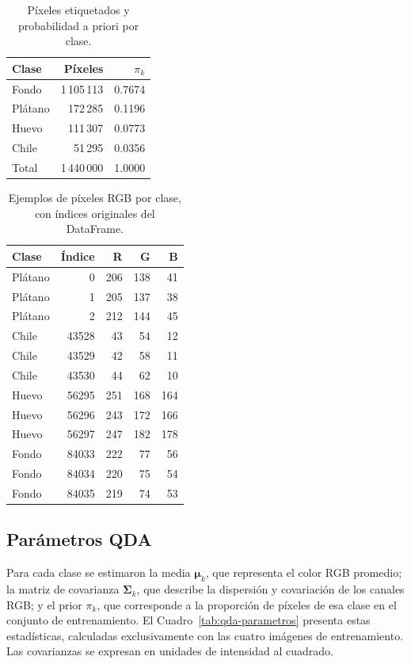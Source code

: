 \documentclass[conference]{IEEEtran}
\begin{document}
\begin{table}[!t]
\centering
\caption{Píxeles etiquetados y probabilidad a priori por clase.}
\label{tab:conteos}
\small
\begin{tabular}{lrr}
\toprule
Clase & Píxeles & $\pi_k$ \\
\midrule
Fondo & 1\,105\,113 & 0.7674 \\
Plátano & 172\,285 & 0.1196 \\
Huevo & 111\,307 & 0.0773 \\
Chile & 51\,295 & 0.0356 \\
\midrule
Total & 1\,440\,000 & 1.0000 \\
\bottomrule
\end{tabular}
\end{table}

\begin{table}[!t]
\centering
\caption{Ejemplos de píxeles RGB por clase, con índices originales del DataFrame.}
\label{tab:ejemplos-rgb}
\scriptsize
\begin{tabular}{lrrrr}
\toprule
Clase & Índice & R & G & B \\
\midrule
Plátano & 0 & 206 & 138 & 41 \\
Plátano & 1 & 205 & 137 & 38 \\
Plátano & 2 & 212 & 144 & 45 \\
Chile & 43528 & 43 & 54 & 12 \\
Chile & 43529 & 42 & 58 & 11 \\
Chile & 43530 & 44 & 62 & 10 \\
Huevo & 56295 & 251 & 168 & 164 \\
Huevo & 56296 & 243 & 172 & 166 \\
Huevo & 56297 & 247 & 182 & 178 \\
Fondo & 84033 & 222 & 77 & 56 \\
Fondo & 84034 & 220 & 75 & 54 \\
Fondo & 84035 & 219 & 74 & 53 \\
\bottomrule
\end{tabular}
\end{table}

\subsection{Parámetros QDA}
Para cada clase se estimaron la media $\boldsymbol{\mu}_k$, que representa el color RGB promedio; la matriz de covarianza $\boldsymbol{\Sigma}_k$, que describe la dispersión y covariación de los canales RGB; y el prior $\pi_k$, que corresponde a la proporción de píxeles de esa clase en el conjunto de entrenamiento. El Cuadro~\ref{tab:qda-parametros} presenta estas estadísticas, calculadas exclusivamente con las cuatro imágenes de entrenamiento. Las covarianzas se expresan en unidades de intensidad al cuadrado.
\end{document}
